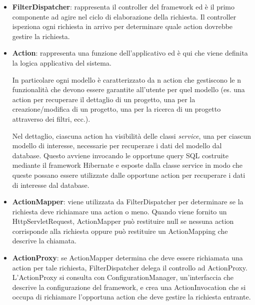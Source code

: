 \begin{itemize}
\item \textbf{FilterDispatcher}: rappresenta il controller del framework ed è il primo componente ad agire nel ciclo di elaborazione della richiesta. Il controller ispeziona ogni richiesta in arrivo per determinare quale action dovrebbe gestire la richiesta.
\setlength{\parskip}{3ex}

\item \textbf{Action}: rappresenta una funzione dell'applicativo ed è qui che viene definita la logica applicativa del sistema.

\setlength{\parskip}{2ex}

In particolare ogni modello è caratterizzato da n action che gestiscono le n funzionalità che devono essere garantite all'utente per quel modello (es. una action per recuperare il dettaglio di un progetto, una per la creazione/modifica di un progetto, una per la ricerca di un progetto attraverso dei filtri, ecc.).

\setlength{\parskip}{2ex}

Nel dettaglio, ciascuna action ha visibilità delle classi \textit{service}, una per ciascun modello di interesse, necessarie per recuperare i dati del modello dal database. Questo avviene invocando le opportune query SQL costruite mediante il framework Hibernate e esposte dalla classe service in modo che queste possano essere utilizzate dalle opportune action per recuperare i dati di interesse dal database.

\setlength{\parskip}{3ex}

\item \textbf{ActionMapper}: viene utilizzata da FilterDispatcher per determinare se la richiesta deve richiamare una action o meno. Quando viene fornito un HttpServletRequest, ActionMapper può restituire null se nessuna action corrisponde alla richiesta  oppure può restituire un ActionMapping che descrive la chiamata.

\setlength{\parskip}{3ex}

\item \textbf{ActionProxy}: se ActionMapper determina che deve essere richiamata una action per tale richiesta, FilterDispatcher delega il controllo ad ActionProxy. L'ActionProxy si consulta con ConfigurationManager, un'interfaccia che descrive la configurazione del framework, e crea una ActionInvocation che si occupa di richiamare l'opportuna action che deve gestire la richiesta entrante.
\setlength{\parskip}{3ex}


\end{itemize}
